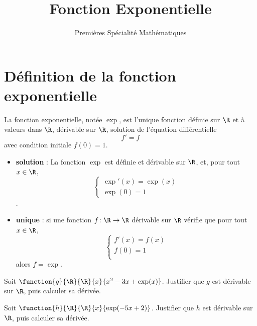 \documentclass{article}
\title{Fonction Exponentielle}
\date{}
\author{Premières Spécialité Mathématiques}
\begin{document}
\maketitle
\section{Définition de la fonction exponentielle}
\begin{tcolorbox}
\begin{definition}
La fonction exponentielle, notée $\exp$, est l'unique fonction définie sur $\R$ et à valeurs dans $\R$, dérivable sur $\R$, solution de l'équation différentielle
\begin{equation*}
f' = f
\end{equation*}
avec condition initiale $f(0) = 1$.
\end{definition}
\begin{remark}
\hfill
\begin{itemize}
\item \textbf{\og solution \fg} : La fonction $\exp$ est définie et dérivable sur $\R$, et, pour tout $x \in \R$, 
\begin{equation*}
\begin{cases}
\exp'(x) = \exp(x)\\
\exp(0) = 1
\end{cases}
\end{equation*}.
\item \textbf{\og unique \fg} : si une fonction $f \colon \R \to \R$ dérivable sur $\R$ vérifie que pour tout $x \in \R$, 
\begin{equation*}
\begin{cases}
f'(x) = f(x)\\
f(0) = 1\\ 
\end{cases}
\end{equation*}
alors $f = \exp$.
\end{itemize}
\end{remark}
\end{tcolorbox}
\begin{example}
\begin{enumquestions}
\item Soit $\function{g}{\R}{\R}{x}{x^2 - 3x + \exp(x)}$. Justifier que $g$ est dérivable sur $\R$, puis calculer sa dérivée.

\vspace*{0.5cm}
\emptybox{3cm}
\item Soit $\function{h}{\R}{\R}{x}{\exp(-5x+2)}$. Justifier que $h$ est dérivable sur $\R$, puis calculer sa dérivée.

\vspace*{0.5cm}
\emptybox{3cm}
\end{enumquestions}
\end{example}
\newpage
\end{document}
